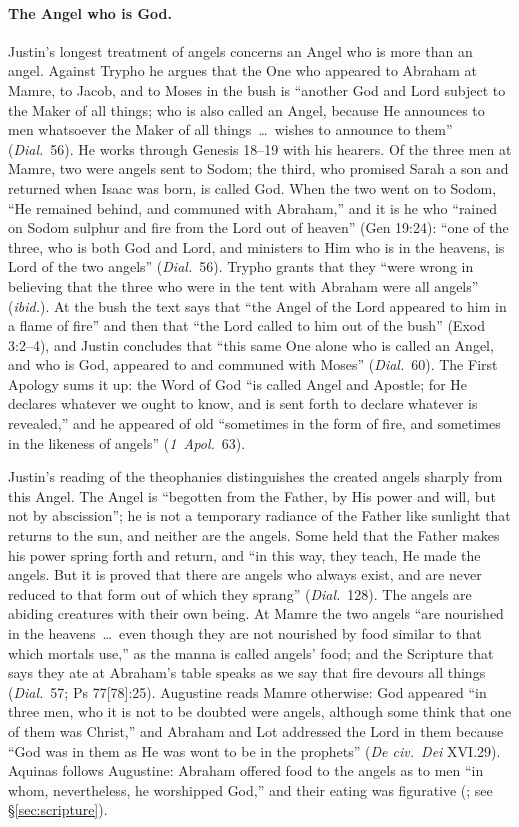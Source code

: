 \paragraph{The Angel who is God.} Justin's longest treatment of angels
concerns an Angel who is more than an angel. Against Trypho he argues that
the One who appeared to Abraham at Mamre, to Jacob, and to Moses in the
bush is ``another God and Lord subject to the Maker of all things; who is
also called an Angel, because He announces to men whatsoever the Maker of
all things~\dots\ wishes to announce to them'' (\emph{Dial.}\ 56). He
works through Genesis 18--19 with his hearers. Of the three men at Mamre,
two were angels sent to Sodom; the third, who promised Sarah a son and
returned when Isaac was born, is called God. When the two went on to
Sodom, ``He remained behind, and communed with Abraham,'' and it is he who
``rained on Sodom sulphur and fire from the Lord out of heaven'' (Gen
19:24): ``one of the three, who is both God and Lord, and ministers to Him
who is in the heavens, is Lord of the two angels'' (\emph{Dial.}\ 56).
Trypho grants that they ``were wrong in believing that the
three who were in the tent with Abraham were all angels'' (\emph{ibid.}).
At the bush the text says that ``the Angel of the Lord appeared to him in a
flame of fire'' and then that ``the Lord called to him out of the bush''
(Exod 3:2--4), and Justin concludes that ``this same One alone who is
called an Angel, and who is God, appeared to and communed with Moses''
(\emph{Dial.}\ 60). The First Apology sums it up: the Word of God ``is
called Angel and Apostle; for He declares whatever we ought to know, and
is sent forth to declare whatever is revealed,'' and he appeared of old
``sometimes in the form of fire, and sometimes in the likeness of angels''
(\emph{1~Apol.}\ 63).

Justin's reading of the theophanies distinguishes the created angels
sharply from this Angel. The Angel is ``begotten from the Father, by His
power and will, but not by abscission''; he is not a temporary radiance of
the Father like sunlight that returns to the sun, and neither are the
angels. Some held that the Father makes his power spring forth and return,
and ``in this way, they teach, He made the angels. But it is proved that
there are angels who always exist, and are never reduced to that form out
of which they sprang'' (\emph{Dial.}\ 128). The angels are abiding
creatures with their own being. At Mamre the two angels ``are nourished in
the heavens~\dots\ even though they are not nourished by food similar to
that which mortals use,'' as the manna is called angels' food; and the
Scripture that says they ate at Abraham's table speaks as we say that fire
devours all things (\emph{Dial.}\ 57; Ps 77[78]:25). Augustine reads
Mamre otherwise: God appeared ``in three men, who it is not to be doubted
were angels, although some think that one of them was Christ,'' and
Abraham and Lot addressed the Lord in them because ``God was in them as He
was wont to be in the prophets'' (\emph{De civ.\ Dei} XVI.29). Aquinas
follows Augustine: Abraham offered food to the angels as to men ``in whom,
nevertheless, he worshipped God,'' and their eating was figurative
(; see \S\ref{sec:scripture}).

